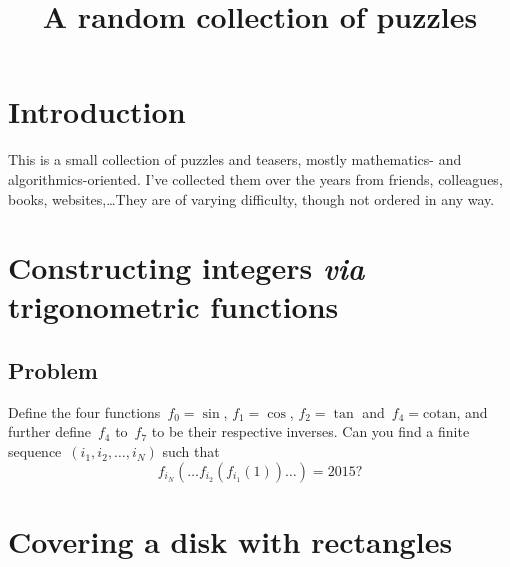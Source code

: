 \documentclass{article}
\begin{document}
\title{A random collection of puzzles}
\maketitle

\section*{Introduction}

This is a small collection of puzzles and teasers, mostly mathematics- and algorithmics-oriented. I've collected them over the years from friends, colleagues, books, websites,\ldots They are of varying difficulty, though not ordered in any way.

\section{Constructing integers {\it via} trigonometric functions}

\subsection{Problem}

Define the four functions~$f_0=\sin $, $f_1=\cos $, $f_2=\tan $ and~$f_4=\mathrm{cotan}$, and further define~$f_4$ to~$f_7$ to be their respective inverses. Can you find a finite sequence~$(i_1, i_2,\ldots ,i_N)$ such that
$$
f_{i_N}\left( \ldots f_{i_2}\left( f_{i_1}(1)\right) \ldots \right) = 2015?
$$


\section{Covering a disk with rectangles}

\end{document}

